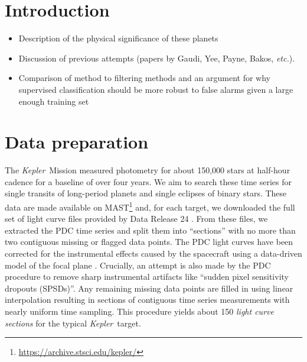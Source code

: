 \documentclass[12pt,preprint]{aastex}
\newcommand{\project}[1]{\textsl{#1}}
\newcommand{\kepler}{\project{Kepler}}
\newcommand{\foreign}[1]{\emph{#1}}
\newcommand{\etc}{\foreign{etc.}}
\begin{document}

\section{Introduction}

\begin{itemize}

\item Description of the physical significance of these planets

\item Discussion of previous attempts (papers by Gaudi, Yee, Payne, Bakos,
\etc).

\item Comparison of method to filtering methods and an argument for why
supervised classification should be more robust to false alarms given a large
enough training set

\end{itemize}

\citep{kois}

\section{Data preparation}

The \kepler\ Mission measured photometry for about 150,000 stars at half-hour
cadence for a baseline of over four years.
We aim to search these time series for single transits of long-period planets
and single eclipses of binary stars.
These data are made available on
MAST\footnote{\url{https://archive.stsci.edu/kepler/}} and, for each target,
we downloaded the full set of light curve files provided by Data Release 24
\citep{Thompson:2015}.
From these files, we extracted the PDC time series and split them into
``sections'' with no more than two contiguous missing or flagged data points.
The PDC light curves have been corrected for the instrumental effects caused
by the spacecraft using a data-driven model of the focal plane
\citep{Stumpe:2012, Smith:2012}.
Crucially, an attempt is also made by the PDC procedure to remove sharp
instrumental artifacts like ``sudden pixel sensitivity dropouts (SPSDs)''.
Any remaining missing data points are filled in using linear interpolation
resulting in sections of contiguous time series measurements with nearly
uniform time sampling.
This procedure yields about 150 \emph{light curve sections} for the typical
\kepler\ target.
\end{document}
